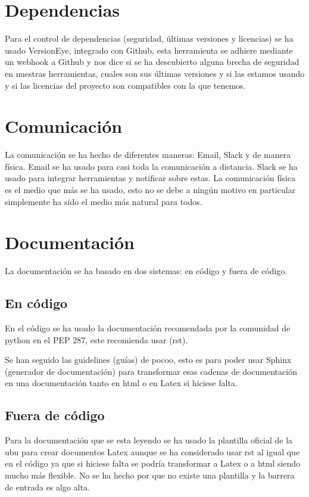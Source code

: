 \section{Dependencias}

Para el control de dependencias (seguridad, últimas versiones y licencias) se ha usado VersionEye, integrado con Github, esta herramienta se adhiere mediante un webhook a Github y nos dice si se ha descubierto alguna brecha de seguridad en nuestras herramientas, cuales son sus últimas versiones y si las estamos usando y si las licencias del proyecto son compatibles con la que tenemos.


\section{Comunicación}

La comunicación se ha hecho de diferentes maneras: Email, Slack y de manera física. Email se ha usado para casi toda la comunicación a distancia. Slack se ha usado para integrar herramientas y notificar sobre estas. La comunicación física es el medio que más se ha usado, esto no se debe a ningún motivo en particular simplemente ha sido el medio más natural para todos.


\section{Documentación}

La documentación se ha basado en dos sistemas: en código y fuera de código. 

\subsection{En código}

En el código se ha usado la documentación recomendada por la comunidad de python en el PEP 287, este recomienda usar  (rst).

Se han seguido las guidelines (guías) de pocoo, esto es para poder usar Sphinx (generador de documentación) para transformar esas cadenas de documentación en una documentación tanto en html o en Latex si hiciese falta.

\subsection{Fuera de código}

Para la documentación que se esta leyendo se ha usado la plantilla oficial de la ubu para crear documentos Latex aunque se ha considerado usar rst al igual que en el código ya que si hiciese falta se podría transformar a Latex o a html siendo mucho más flexible. No se ha hecho por que no existe una plantilla y la barrera de entrada es algo alta.


